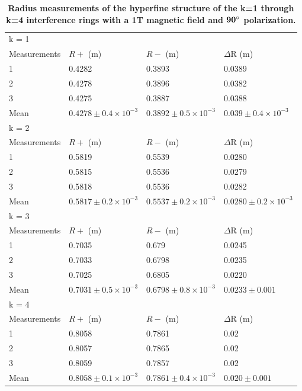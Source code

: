 \documentclass[twocolumn]{article}
\begin{document}
			\begin{table}[]
				\centering
				\begin{tabular}{l|lll}
					k = 1 & & & \\
					Measurements & $R+$ (m) & $R-$ (m)  & $\Delta$R (m) \\ \hline
					1         & 0.4282 & 0.3893  & 0.0389 \\
					2         & 0.4278 & 0.3896  & 0.0382 \\
					3         & 0.4275 & 0.3887  & 0.0388 \\
					Mean      & $0.4278\pm0.4\times10^{-3}$       & $0.3892\pm0.5\times10^{-3}$        & $0.039\pm0.4\times10^{-3}$ \\ \hline
					k = 2 & & & \\
					Measurements & $R+$ (m) & $R-$ (m)  & $\Delta$R (m) \\ \hline
					1           & 0.5819 & 0.5539 & 0.0280 \\
					2           & 0.5815 & 0.5536 & 0.0279 \\
					3           & 0.5818 & 0.5536 & 0.0282 \\
					Mean        & $0.5817\pm0.2\times10^{-3}$ & $0.5537\pm0.2\times10^{-3}$ & $0.0280\pm0.2\times10^{-3}$ \\ \hline
					k = 3 & & & \\
					Measurements & $R+$ (m) & $R-$ (m)  & $\Delta$R (m) \\ \hline
					1    & 0.7035 & 0.679  & 0.0245 \\
					2    & 0.7033 & 0.6798 & 0.0235 \\
					3    & 0.7025 & 0.6805 & 0.0220 \\
					Mean & $0.7031\pm0.5\times10^{-3}$ & $0.6798\pm0.8\times10^{-3}$ & $0.0233\pm0.001$ \\ \hline
					k = 4 & & & \\
					Measurements & $R+$ (m) & $R-$ (m)  & $\Delta$R (m) \\ \hline
					1    & 0.8058 & 0.7861 & 0.02  \\
					2    & 0.8057 & 0.7865 & 0.02  \\
					3    & 0.8059 & 0.7857 & 0.02  \\
					Mean & $0.8058\pm0.1\times10^{-3}$ & $0.7861\pm0.4\times10^{-3}$ & $0.020\pm0.001$
				\end{tabular}
				
				
				\caption{\textbf{Radius measurements of the hyperfine structure of the k=1 through k=4 interference rings with a 1T magnetic field and $\mathbf{90\degree}$ polarization.}}
				\label{tab:RadiusMeasurements}
			\end{table}
			
\end{document}
